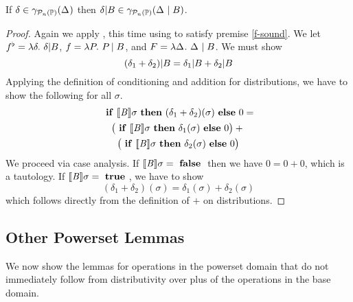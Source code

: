 \begin{lemma} \label{lem:ppp:cond}
If $ \delta \in \gamma_{\mathcal{P}_{n}\left( \mathbb{P} \right)}(\Delta_{}) $ then $
  \delta | B \in \gamma_{\mathcal{P}_{n}\left( \mathbb{P} \right)}(\Delta_{} \mid B) $.
\end{lemma}
\begin{proof}
Again we apply , this time using 
to satisfy premise \ref{f-sound}.  We let
$\fflat = \lambda \delta.\ \dcond{\delta}{B}$,
$f = \lambda P_{}.\ P_{} \mid B$, and
$F = \lambda \Delta_{}.\ \Delta_{} \mid B$.
We must show
\[(\delta_1 + \delta_2) | B = \delta_1 | B + \delta_2 | B\]
Applying the definition of conditioning and addition for distributions, we have
to show the following for all $\sigma$.
\begin{multline*}
\text{ \textbf{if} } [\![{\mathit{B}}]\!]{\sigma} \text{ \textbf{then} }
(\delta_1+\delta_2)(\sigma) \text{ \textbf{else} } 0 =\\
\bigl(\text{ \textbf{if} } [\![{\mathit{B}}]\!]{\sigma} \text{ \textbf{then} }
\delta_1(\sigma) \text{ \textbf{else} } 0\bigr) + {}\\
\bigl(\text{ \textbf{if} } [\![{\mathit{B}}]\!]{\sigma} \text{ \textbf{then} }
\delta_2(\sigma) \text{ \textbf{else} } 0\bigr)
\end{multline*}
We proceed via case analysis.  If $[\![{\mathit{B}}]\!]{\sigma} = \text{ \textbf{false} }$ then we
have $0 = 0 + 0$, which is a tautology.  If $[\![{\mathit{B}}]\!]{\sigma} = \text{ \textbf{true} }$,
we have to show
\[(\delta_1+\delta_2)(\sigma) = \delta_1(\sigma) + \delta_2(\sigma)\]
which follows directly from the definition of $+$ on distributions.
\end{proof}

\subsection{Other Powerset Lemmas}

We now show the lemmas for operations in the powerset domain that do not immediately
follow from distributivity over plus of the operations in the base domain.

